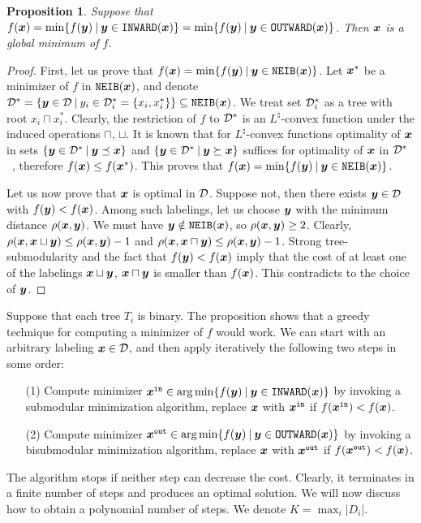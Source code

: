 \documentclass[11pt,onecolumn]{article}
\newtheorem{proposition}[theorem]{Proposition}
\def\D{{\cal D}}
\def\INWARD{\texttt{INWARD}}
\def\OUTWARD{\texttt{OUTWARD}}
\def\NEIB{\texttt{NEIB}}
\newcommand{\bx}{\mbox{\boldmath $x$}}
\newcommand{\by}{\mbox{\boldmath $y$}}
\begin{document}
\begin{proposition} Suppose that {\em $f(\bx)=\min\{ f(\by) \: | \: \by\in\INWARD(\bx)\}  =  \min\{ f(\by) \: | \: \by\in\OUTWARD(\bx)\}$.} Then $\bx$ is a global minimum of $f$.
\label{prop:local}
\end{proposition}
\begin{proof}
First, let us prove that $f(\bx)=\min\{ f(\by) \: | \: \by\in\NEIB(\bx)\}$.
Let $\bx^\ast$ be a minimizer of $f$ in $\NEIB(\bx)$, and denote $\D^\ast=\{\by\in \D\:|\:y_i\in \D^\ast_i=\{x_i,x^\ast_i\}\}\subseteq\NEIB(\bx)$.
We treat set $\D^\ast_i$ as a tree with root $x_i\sqcap x^\ast_i$.
Clearly, the restriction of $f$ to $\D^\ast$ is an $L^\natural$-convex function under 
the induced operations $\sqcap$, $\sqcup$. It is known that for $L^\natural$-convex functions
optimality of $\bx$ in sets $\{\by\in \D^\ast\:|\: \by\preceq \bx\}$ and $\{\by\in \D^\ast\:|\: \by\succeq \bx\}$
suffices for optimality of $\bx$ in $\D^\ast$~\cite[Theorem 7.14]{Murota:book}, therefore $f(\bx)\le f(\bx^\ast)$.
This proves that $f(\bx)=\min\{ f(\by) \: | \: \by\in\NEIB(\bx)\}$.

Let us now prove that $\bx$ is optimal in $\D$.
Suppose not, then there exists $\by\in \D$ with $f(\by)<f(\bx)$.
Among such labelings, let us choose $\by$ with the minimum distance $\rho(\bx,\by)$. We must have $\by\notin\NEIB(\bx)$, so $\rho(\bx,\by)\ge 2$. Clearly,
$\rho(\bx,\bx\sqcup\by)\le \rho(\bx,\by)-1$ and $\rho(\bx,\bx\sqcap\by)\le \rho(\bx,\by)-1$.
Strong tree-submodularity and the fact that $f(\by)<f(\bx)$
imply that the cost of at least one of the labelings $\bx\sqcup\by$, $\bx\sqcap\by$ is smaller than $f(\bx)$.
This contradicts to the choice of $\by$.
\end{proof}

Suppose that each tree $T_i$ is binary.
The proposition shows that a greedy technique for computing a minimizer of $f$ would work. We can start with an arbitrary labeling $\bx\in \D$,
and then apply iteratively the following two steps in some order:
\begin{itemize}
\item[(1)] Compute minimizer $\bx^{\tt in}\in\arg\min\{f(\by)\:|\:\by\in\INWARD(\bx)\}$ by invoking a submodular minimization algorithm, replace $\bx$ with $\bx^{\tt in}$ if $f(\bx^{\tt in})<f(\bx)$.
\item[(2)] Compute minimizer $\bx^{\tt out}\in\arg\min\{f(\by)\:|\:\by \in\OUTWARD(\bx)\}$ by invoking a bisubmodular minimization algorithm, replace $\bx$ with $\bx^{\tt out}$ if $f(\bx^{\tt out})<f(\bx)$. 
\end{itemize}
The algorithm stops if neither step can decrease the cost. Clearly, it terminates in a finite number of steps and produces an optimal solution.
We will now discuss how to obtain a polynomial number of steps. We denote $K=\max_i |D_i|$.
\end{document}
